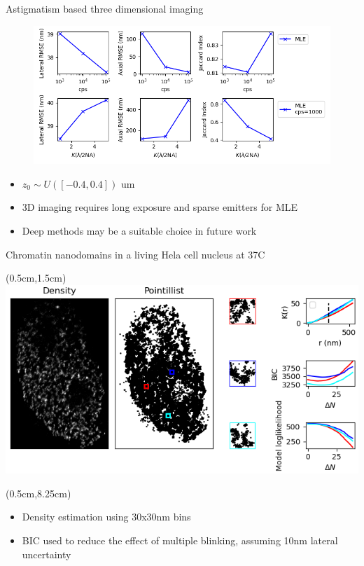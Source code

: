 \documentclass{beamer}					%
\begin{document}
\begin{frame}{Astigmatism based three dimensional imaging}
\begin{figure}
\includegraphics[width=13cm]{PSF3D.png}
\end{figure}
\begin{itemize}
\item $z_{0}\sim U([-0.4,0.4])$ um
\item 3D imaging requires long exposure and sparse emitters for MLE
\item Deep methods may be a suitable choice in future work
\end{itemize}
\end{frame}


\begin{frame}{Chromatin nanodomains in a living Hela cell nucleus at 37C}

\begin{textblock*}{13cm}(0.5cm,1.5cm)
\includegraphics[width=\textwidth]{Cluster.png}
\end{textblock*}

\begin{textblock*}{13cm}(0.5cm,8.25cm)
\begin{itemize}
\item Density estimation using 30x30nm bins
\item BIC used to reduce the effect of multiple blinking, assuming 10nm lateral uncertainty
\end{itemize}
\end{textblock*}

\end{frame}
\end{document}
